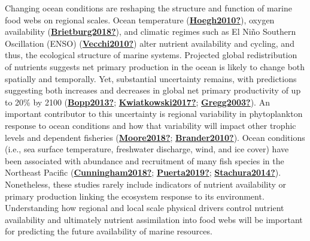 \documentclass [11pt, proquest] {uwthesis}[2015/03/03]
\begin{document}
Changing ocean conditions are reshaping the structure and function of marine food webs on regional scales. Ocean temperature (\protect\hyperlink{ref-Hoegh2010}{\textbf{Hoegh2010?}}), oxygen availability (\protect\hyperlink{ref-Brietburg2018}{\textbf{Brietburg2018?}}), and climatic regimes such as El Niño Southern Oscillation (ENSO) (\protect\hyperlink{ref-Vecchi2010}{\textbf{Vecchi2010?}}) alter nutrient availability and cycling, and thus, the ecological structure of marine systems. Projected global redistribution of nutrients suggests net primary production in the ocean is likely to change both spatially and temporally. Yet, substantial uncertainty remains, with predictions suggesting both increases and decreases in global net primary productivity of up to 20\% by 2100 (\protect\hyperlink{ref-Bopp2013}{\textbf{Bopp2013?}}; \protect\hyperlink{ref-Kwiatkowski2017}{\textbf{Kwiatkowski2017?}}; \protect\hyperlink{ref-Gregg2003}{\textbf{Gregg2003?}}). An important contributor to this uncertainty is regional variability in phytoplankton response to ocean conditions and how that variability will impact other trophic levels and dependent fisheries (\protect\hyperlink{ref-Moore2018}{\textbf{Moore2018?}}; \protect\hyperlink{ref-Brander2010}{\textbf{Brander2010?}}). Ocean conditions (i.e., sea surface temperature, freshwater discharge, wind, and ice cover) have been associated with abundance and recruitment of many fish species in the Northeast Pacific (\protect\hyperlink{ref-Cunningham2018}{\textbf{Cunningham2018?}}; \protect\hyperlink{ref-Puerta2019}{\textbf{Puerta2019?}}; \protect\hyperlink{ref-Stachura2014}{\textbf{Stachura2014?}}). Nonetheless, these studies rarely include indicators of nutrient availability or primary production linking the ecosystem response to its environment. Understanding how regional and local scale physical drivers control nutrient availability and ultimately nutrient assimilation into food webs will be important for predicting the future availability of marine resources.
\end{document}
